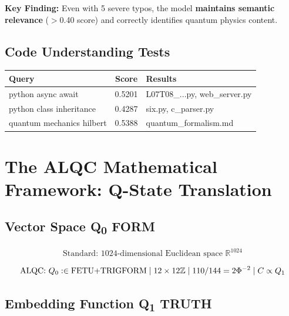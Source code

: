\textbf{Key Finding:} Even with 5 severe typos, the model \textbf{maintains semantic relevance} ($>$0.40 score) and correctly identifies quantum physics content.

\subsection{Code Understanding Tests}

\begin{table}[h]
\centering
\scriptsize
\begin{tabular}{|l|c|p{}|}
\hline
\textbf{Query} & \textbf{Score} & \textbf{Results} \\
\hline
python async await & 0.5201 & L07T08\_...py, web\_server.py \\
python class inheritance & 0.4287 & six.py, c\_parser.py \\
quantum mechanics hilbert & 0.5388 & quantum\_formalism.md \\
\hline
\end{tabular}
\end{table}

\section{The ALQC Mathematical Framework: Q-State Translation}

\subsection{\texorpdfstring{Vector Space \rightarrow Q\textsubscript{0} FORM}{Vector Space to Q0 FORM}}

\begin{equation}
\text{Standard: } 1024\text{-dimensional Euclidean space } \mathbb{R}^{1024}
\end{equation}

\begin{equation}
\text{ALQC: } Q\textsubscript{0}: \in \text{FETU+TRIGFORM} \mid 12\times12\mathbb{Z} \mid 110/144 = 2\Phi^{-2} \mid C \propto Q\textsubscript{1}
\end{equation}

\subsection{\texorpdfstring{Embedding Function \rightarrow Q\textsubscript{1} TRUTH}{Embedding Function to Q1 TRUTH}}

